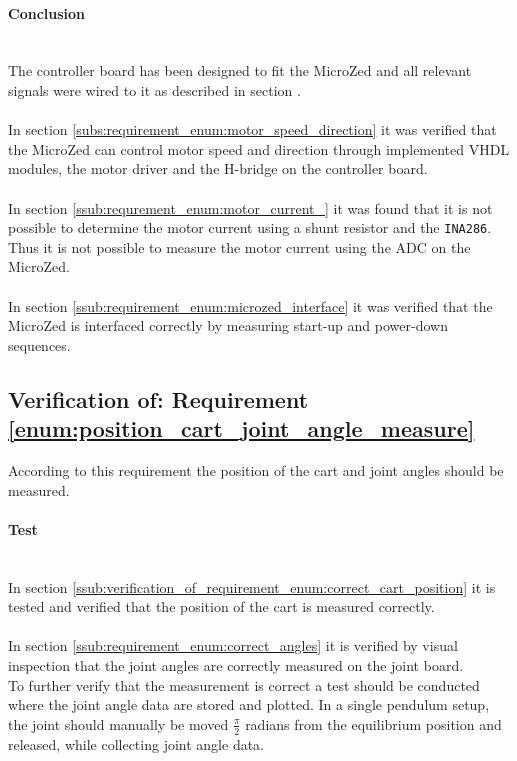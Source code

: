 \paragraph{Conclusion}~\\
The controller board has been designed to fit the MicroZed and all relevant signals were wired to it as described in section \label{sec:controller_board}.
\\~\\
In section \ref{subs:requirement_enum:motor_speed_direction} it was verified that the MicroZed can control motor speed and direction through implemented VHDL modules, the motor driver and the H-bridge on the controller board. 
\\~\\
In section \ref{ssub:requrement_enum:motor_current_} it was found that it is not possible to determine the motor current using a shunt resistor and the \texttt{INA286}. 
Thus it is not possible to measure the motor current using the ADC on the MicroZed.
\\~\\
In section \ref{ssub:requirement_enum:microzed_interface} it was verified that the MicroZed is interfaced correctly by measuring start-up and power-down sequences.



\subsection{Verification of: Requirement \ref{enum:position_cart_joint_angle_measure}} %
\label{sub:verification_of_requirement_enum:position_cart_joint_angle_measure}
According to this requirement the position of the cart and joint angles should be measured.

\paragraph{Test}~\\
In section \ref{ssub:verification_of_requirement_enum:correct_cart_position} it is tested and verified that the position of the cart is measured correctly. 
\\~\\
In section \ref{ssub:requirement_enum:correct_angles} it is verified by visual inspection that the joint angles are correctly measured on the joint board.
\\
To further verify that the measurement is correct a test should be conducted where the joint angle data are stored and plotted.  
In a single pendulum setup, the joint should manually be moved $\frac{\pi}{2}$ radians from the equilibrium position and released, while collecting joint angle data.

